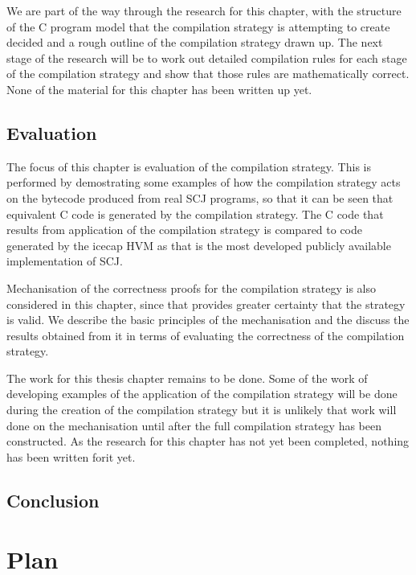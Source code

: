 \documentclass[a4paper,10pt]{report}
\begin{document}
We are part of the way through the research for this chapter, with the
structure of the C program model that the compilation strategy is
attempting to create decided and a rough outline of the compilation
strategy drawn up.
The next stage of the research will be to work out detailed
compilation rules for each stage of the compilation strategy and show
that those rules are mathematically correct.
None of the material for this chapter has been written up yet.

\section{Evaluation}

The focus of this chapter is evaluation of the compilation strategy.
This is performed by demostrating some examples of how the compilation
strategy acts on the bytecode produced from real SCJ programs, so that
it can be seen that equivalent C code is generated by the compilation
strategy.
The C code that results from application of the compilation strategy
is compared to code generated by the icecap HVM as that is the most
developed publicly available implementation of SCJ.

Mechanisation of the correctness proofs for the compilation strategy
is also considered in this chapter, since that provides greater
certainty that the strategy is valid.
We describe the basic principles of the mechanisation and the discuss
the results obtained from it in terms of evaluating the correctness of
the compilation strategy.

The work for this thesis chapter remains to be done.
Some of the work of developing examples of the application of the
compilation strategy will be done during the creation of the
compilation strategy but it is unlikely that work will done on the
mechanisation until after the full compilation strategy has been
constructed.
As the research for this chapter has not yet been completed, nothing
has been written forit yet.

\section{Conclusion}

\chapter{Plan}
\end{document}

